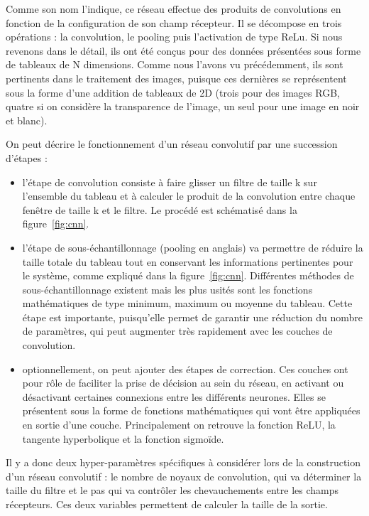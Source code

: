 

Comme son nom l'indique, ce réseau effectue des produits de convolutions en fonction de la configuration de son champ récepteur. Il se décompose en trois opérations : la convolution, le pooling puis l'activation de type ReLu.
Si nous revenons dans le détail, ils ont été conçus pour des données présentées sous forme de tableaux de N dimensions. Comme nous l'avons vu précédemment, ils sont pertinents dans le traitement des images, puisque ces dernières se représentent sous la forme d'une addition de tableaux de 2D (trois pour des images RGB, quatre si on considère la transparence de l'image, un seul pour une image en noir et blanc).

On peut décrire le fonctionnement d'un réseau convolutif par une succession d'étapes :

\begin{itemize}
  \item l'étape de convolution consiste à faire glisser un filtre de taille k sur l'ensemble du tableau et à calculer le produit de la convolution entre chaque fenêtre de taille k et le filtre. Le procédé est schématisé dans la figure~\ref{fig:cnn}.
  \item l'étape de sous-échantillonnage (pooling en anglais) va permettre de réduire la taille totale du tableau tout en conservant les informations pertinentes pour le système, comme expliqué dans la figure~\ref{fig:cnn}. Différentes méthodes de sous-échantillonnage existent mais les plus usités sont les fonctions mathématiques de type minimum, maximum ou moyenne du tableau. Cette étape est importante, puisqu'elle permet de garantir une réduction du nombre de paramètres, qui peut augmenter très rapidement avec les couches de convolution.
  \item optionnellement, on peut ajouter des étapes de correction. Ces couches ont pour rôle de faciliter la prise de décision au sein du réseau, en activant ou désactivant certaines connexions entre les différents neurones. Elles se présentent sous la forme de fonctions mathématiques qui vont être appliquées en sortie d'une couche. Principalement on retrouve la fonction ReLU, la tangente hyperbolique et la fonction sigmoïde.
\end{itemize}

Il y a donc deux hyper-paramètres spécifiques à considérer lors de la construction d'un réseau convolutif : le nombre de noyaux de convolution, qui va déterminer la taille du filtre et le pas qui va contrôler les chevauchements entre les champs récepteurs. Ces deux variables permettent de calculer la taille de la sortie.

